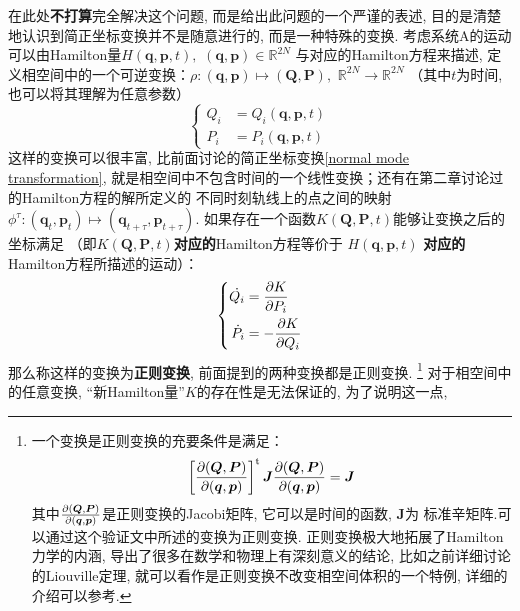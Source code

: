     在此处\textbf{不打算}完全解决这个问题, 而是给出此问题的一个严谨的表述, 
    目的是清楚地认识到简正坐标变换并不是随意进行的, 而是一种特殊的变换.
    考虑系统A的运动可以由Hamilton量$H(\bm{q},\bm{p},t),\,\,(\bm{q},\bm{p})\in\mathbb{R}^{2N}$
    与对应的Hamilton方程来描述, 定义相空间中的一个可逆变换：$\rho:(\bm{q},\bm{p})\mapsto(\bm{Q}, \bm{P}),\,\,\mathbb{R}^{2N}\to\mathbb{R}^{2N}$
    （其中$t$为时间, 也可以将其理解为任意参数）
    \begin{equation}
        \left\{
        \begin{split}
            Q_i &= Q_i(\bm{q},\bm{p}, t)\\
            P_i &= P_i(\bm{q}, \bm{p}, t)
        \end{split}
        \right.
    \end{equation}
    这样的变换可以很丰富, 比前面讨论的简正坐标变换\ref{normal mode transformation}, 
    就是相空间中不包含时间的一个线性变换；还有在第二章讨论过的Hamilton方程的解所定义的
    不同时刻轨线上的点之间的映射
    $\phi^{\tau}:(\bm{q}_{t},\bm{p}_{t})\mapsto(\bm{q}_{t+\tau},\bm{p}_{t+\tau})$.
    如果存在一个函数$K(\bm{Q}, \bm{P}, t)$能够让变换之后的坐标满足
    （即$K(\bm{Q}, \bm{P}, t)$\textbf{对应的}Hamilton方程等价于
    $H(\bm{q},\bm{p},t)$
    \textbf{对应的}Hamilton方程所描述的运动）：
    \begin{equation}
        \left\{
        \begin{split}
            \dot{Q_i} &= \frac{\partial{K}}{\partial{P_i}}\\
            \dot{P_{i}} &= -\frac{\partial{K}}{\partial{Q_i}}
        \end{split}
        \right.
    \end{equation}
    那么称这样的变换为\textbf{正则变换}, 前面提到的两种变换都是正则变换.
    \footnote{
        一个变换是正则变换的充要条件是满足：
        \begin{equation}
            \left[\frac{\partial{(\bm{Q},\bm{P})}}{\partial{(\bm{q}, \bm{p})}}\right]^{\mathrm{t}}\bm{J}\frac{\partial{(\bm{Q},\bm{P})}}{\partial{(\bm{q}, \bm{p})}} = \bm{J}
        \end{equation}
        其中$\frac{\partial{(\bm{Q},\bm{P})}}{\partial{(\bm{q}, \bm{p})}}$是正则变换的Jacobi矩阵, 它可以是时间的函数, $\bm{J}$为
        标准辛矩阵.可以通过这个验证文中所述的变换为正则变换.
        正则变换极大地拓展了Hamilton力学的内涵, 导出了很多在数学和物理上有深刻意义的结论, 
        比如之前详细讨论的Liouville定理, 就可以看作是正则变换不改变相空间体积的一个特例, 
        详细的介绍可以参考\cite{Goldstein2000Classical}.
    }
    对于相空间中的任意变换, “新Hamilton量”$K$的存在性是无法保证的, 为了说明这一点, 
